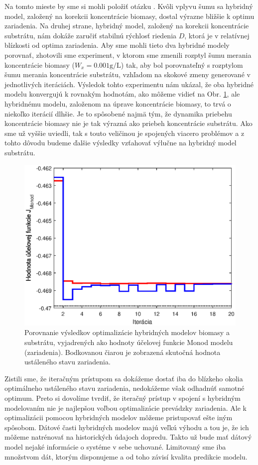 Na tomto mieste by sme si mohli položiť otázku . Kvôli vplyvu šumu sa hybridný model, založený na korekcii koncentrácie biomasy, dostal výrazne bližšie k optimu zariadenia. Na druhej strane, hybridný model, založený na korekcii koncentrácie substrátu, nám dokáže zaručiť stabilnú rýchlosť riedenia $ D $, ktorá je v relatívnej blízkosti od optima zariadenia. Aby sme mohli tieto dva hybridné modely porovnať, zhotovili sme experiment, v ktorom sme zmenili rozptyl šumu merania koncentrácie biomasy ($ W_{x} = 0.001\si{\gram\per\liter} $) tak, aby bol porovnateľný s rozptylom šumu merania koncentrácie substrátu, vzhľadom na skokové zmeny generované v jednotlivých iteráciách. Výsledok tohto experimentu nám ukázal, že oba hybridné modelu konvergujú k rovnakým hodnotám, ako môžeme vidieť na Obr. \ref{fig:hybrid_sub_and_bio_compar}, ale hybridnému modelu, založenom na úprave koncentrácie biomasy, to trvá o niekoľko iterácií dlhšie. Je to spôsobené najmä tým, že dynamika priebehu koncentrácie biomasy nie je tak výrazná ako priebeh koncentrácie substrátu. Ako sme už vyššie uviedli, tak s touto veličinou je spojených viacero problémov a z tohto dôvodu budeme ďalšie výsledky vzťahovať výlučne na hybridný model substrátu. 
\begin{figure}
	\centering
	\includegraphics[width=0.7\linewidth]{images/hybrid_sub_and_bio_compar}
	\caption{Porovnanie výsledkov optimalizácie hybridných modelov biomasy a substrátu, vyjadrených ako hodnoty účelovej funkcie Monod modelu (zariadenia). Bodkovanou čiarou je zobrazená skutočná hodnota ustáleného stavu zariadenia.}
	\label{fig:hybrid_sub_and_bio_compar}
\end{figure}

Zistili sme, že iteračným prístupom sa dokážeme dostať iba do blízkeho okolia optimálneho ustáleného stavu zariadenia, nedokážeme však odhadnúť samotné optimum. Preto si dovolíme tvrdiť, že iteračný prístup v spojení s hybridným modelovaním nie je najlepšou voľbou optimalizácie prevádzky zariadenia. Ale k optimalizácii pomocou hybridných modelov môžeme pristupovať ešte iným spôsobom. Dátové časti hybridných modelov majú veľkú výhodu a tou je, že ich môžeme natrénovať na historických údajoch dopredu. Takto už bude mať dátový model nejaké informácie o systéme v sebe uchované. Limitovaný sme iba množstvom dát, ktorým disponujeme a od toho závisí kvalita predikcie modelu. 

